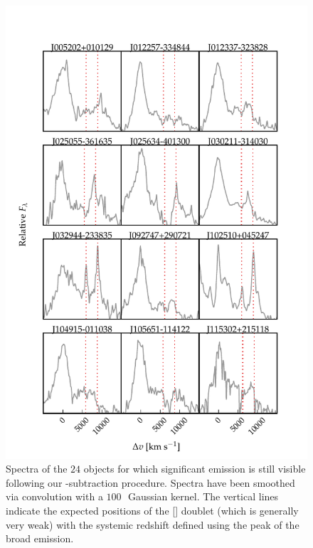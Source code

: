 \begin{figure}
    \centering
    \includegraphics[width=\columnwidth]{figures/chapter04/example_spectrum_grid_extreme_fe_1.pdf} 
    \caption[{Spectra of the $24$ objects for which significant  emission is still visible following our -subtraction procedure.}]{Spectra of the $24$ objects for which significant  emission is still visible following our -subtraction procedure. Spectra have been smoothed via convolution with a $100$\,\kms\, Gaussian kernel. The vertical lines indicate the expected positions of the [] doublet (which is generally very weak) with the systemic redshift defined using the peak of the broad \hb emission.}     
    \label{fig:bad_fe}
\end{figure}

